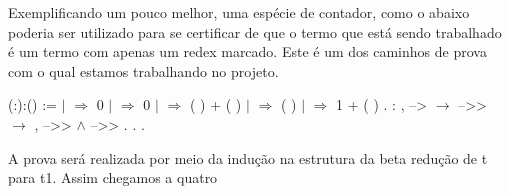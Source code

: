  Exemplificando um pouco melhor, uma espécie de contador, como o abaixo poderia ser utilizado para se certificar de que
o termo que está sendo trabalhado é um termo com apenas um redex marcado. Este é um dos caminhos de prova com o qual estamos
trabalhando no projeto.\begin{coqdoccode}
\coqdocemptyline
\coqdocnoindent
{}  (:):() :=\coqdoceol
\coqdocnoindent
{}  \coqdoceol
\coqdocindent{1.00em}
\ensuremath{|}   \ensuremath{\Rightarrow} 0\coqdoceol
\coqdocindent{1.00em}
\ensuremath{|}   \ensuremath{\Rightarrow} 0\coqdoceol
\coqdocindent{1.00em}
\ensuremath{|}    \ensuremath{\Rightarrow} ( ) + ( )\coqdoceol
\coqdocindent{1.00em}
\ensuremath{|}      \ensuremath{\Rightarrow} ( )\coqdoceol
\coqdocindent{1.00em}
\ensuremath{|}     \ensuremath{\Rightarrow} 1 + ( )\coqdoceol
\coqdocnoindent
{}.\coqdoceol
\coqdocemptyline
\coqdocemptyline
\coqdocnoindent
{} : \coqdockw{\ensuremath{\forall}}    ,  -->  \ensuremath{\rightarrow}  -->>  \ensuremath{\rightarrow} \coqdoctac{\ensuremath{\exists}} ,  -->>  \ensuremath{\land}  -->> .\coqdoceol
\coqdocnoindent
{}.\coqdoceol
\coqdocindent{1.00em}
     .\coqdoceol
\coqdocemptyline
\end{coqdoccode}
A prova será realizada por meio da indução na estrutura da beta redução de t para t1. Assim chegamos a quatro
